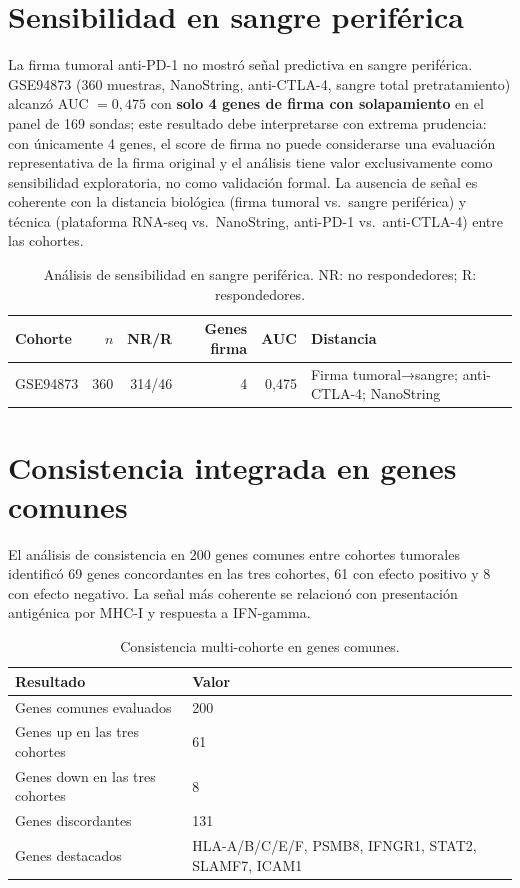 \section{Sensibilidad en sangre periférica}

La firma tumoral anti-PD-1 no mostró señal predictiva en sangre periférica. GSE94873 \cite{GSE94873,Friedlander2017} (360 muestras, NanoString, anti-CTLA-4, sangre total pretratamiento) alcanzó AUC $= 0{,}475$ con \textbf{solo 4 genes de firma con solapamiento} en el panel de 169 sondas; este resultado debe interpretarse con extrema prudencia: con únicamente 4 genes, el score de firma no puede considerarse una evaluación representativa de la firma original y el análisis tiene valor exclusivamente como sensibilidad exploratoria, no como validación formal. La ausencia de señal es coherente con la distancia biológica (firma tumoral vs.\ sangre periférica) y técnica (plataforma RNA-seq vs.\ NanoString, anti-PD-1 vs.\ anti-CTLA-4) entre las cohortes.

\begin{table}[H]
\centering
\caption{Análisis de sensibilidad en sangre periférica. NR: no respondedores; R: respondedores.}
\label{tab:sensibilidad_sangre}
\begin{tabularx}{\textwidth}{l r r r r X}
\toprule
Cohorte & $n$ & NR/R & Genes firma & AUC & Distancia \\
\midrule
GSE94873 & 360 & 314/46 & 4 & 0{,}475 & Firma tumoral→sangre; anti-CTLA-4; NanoString \\
\bottomrule
\end{tabularx}
\end{table}

\section{Consistencia integrada en genes comunes}

El análisis de consistencia en 200 genes comunes entre cohortes tumorales identificó 69 genes concordantes en las tres cohortes, 61 con efecto positivo y 8 con efecto negativo. La señal más coherente se relacionó con presentación antigénica por MHC-I y respuesta a IFN-gamma.

\begin{table}[H]
\centering
\caption{Consistencia multi-cohorte en genes comunes.}
\label{tab:consistencia}
\begin{tabularx}{\textwidth}{l l}
\toprule
Resultado & Valor \\
\midrule
Genes comunes evaluados & 200 \\
Genes up en las tres cohortes & 61 \\
Genes down en las tres cohortes & 8 \\
Genes discordantes & 131 \\
Genes destacados & HLA-A/B/C/E/F, PSMB8, IFNGR1, STAT2, SLAMF7, ICAM1 \\
\bottomrule
\end{tabularx}
\end{table}

